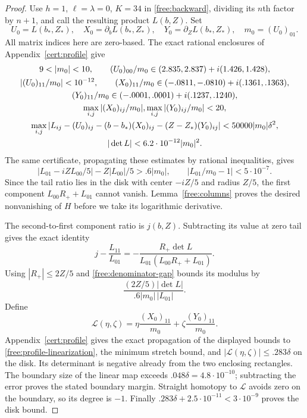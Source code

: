 \begin{proof}
Use $h=1$, $\ell=\lambda=0$, $K=34$ in
\eqref{free:backward}, dividing its $n$th factor by $n+1$, and call
the resulting product $L(b,Z)$.  Set
\[
 U_0=L(b_*,Z_*),\quad X_0=\partial_bL(b_*,Z_*),\quad
 Y_0=\partial_ZL(b_*,Z_*),\quad m_0=(U_0)_{01}.
\]
All matrix indices here are zero-based.  The exact rational
enclosures of Appendix~\ref{cert:profile} give
\begin{gather}
 9<|m_0|<10,\qquad
 (U_0)_{00}/m_0\in(2.835,2.837)+i(1.426,1.428),\notag\\
 |(U_0)_{11}/m_0|<10^{-12},\qquad
 (X_0)_{11}/m_0\in(-.0811,-.0810)+i(.1361,.1363),\notag\\
 (Y_0)_{11}/m_0\in(-.0001,.0001)+i(.1237,.1240),\notag\\
 \max_{i,j}|(X_0)_{ij}/m_0|,
 \max_{i,j}|(Y_0)_{ij}/m_0|<20,\notag\\
 \max_{i,j}|L_{ij}-(U_0)_{ij}-(b-b_*)(X_0)_{ij}
                   -(Z-Z_*)(Y_0)_{ij}|<50000|m_0|\delta^2,\notag\\
 |\det L|<6.2\cdot10^{-12}|m_0|^2.\label{free:profile-enclosures}
\end{gather}
The same certificate, propagating these estimates by rational
inequalities, gives
\begin{equation}\label{free:denominator-gap}
 |L_{01}-iZL_{00}/5|-Z|L_{00}|/5>.6|m_0|,
 \qquad |L_{01}/m_0-1|<5\cdot10^{-7}.
\end{equation}
Since the tail ratio lies in the disk with center $-iZ/5$ and radius
$Z/5$, the first component $L_{00}R_++L_{01}$ cannot vanish.
Lemma~\ref{free:columns} proves the desired nonvanishing of $H$ before
we take its logarithmic derivative.

The second-to-first component ratio is $j(b,Z)$.  Subtracting its value
at zero tail gives the exact identity
\[
 j-\frac{L_{11}}{L_{01}}
 =-\frac{R_+\det L}{L_{01}(L_{00}R_++L_{01})}.
\]
Using $|R_+|\le2Z/5$ and \eqref{free:denominator-gap} bounds its
modulus by
\[
 \frac{(2Z/5)|\det L|}{.6|m_0|\,|L_{01}|}.
\]
Define
\[
 \mathcal L(\eta,\zeta)=
 \eta\frac{(X_0)_{11}}{m_0}+\zeta\frac{(Y_0)_{11}}{m_0}.
\]
Appendix~\ref{cert:profile} gives the exact propagation of the displayed
bounds to \eqref{free:profile-linearization}, the minimum stretch
bound, and $|\mathcal L(\eta,\zeta)|\le.283\delta$ on the disk.
Its determinant is negative already from the two enclosing
rectangles.  The boundary size of the linear map exceeds
$.048\delta=4.8\cdot10^{-10}$; subtracting the error proves the
stated boundary margin.  Straight homotopy to $\mathcal L$ avoids
zero on the boundary, so its degree is $-1$.  Finally
$.283\delta+2.5\cdot10^{-11}<3\cdot10^{-9}$ proves the disk bound.
\end{proof}

